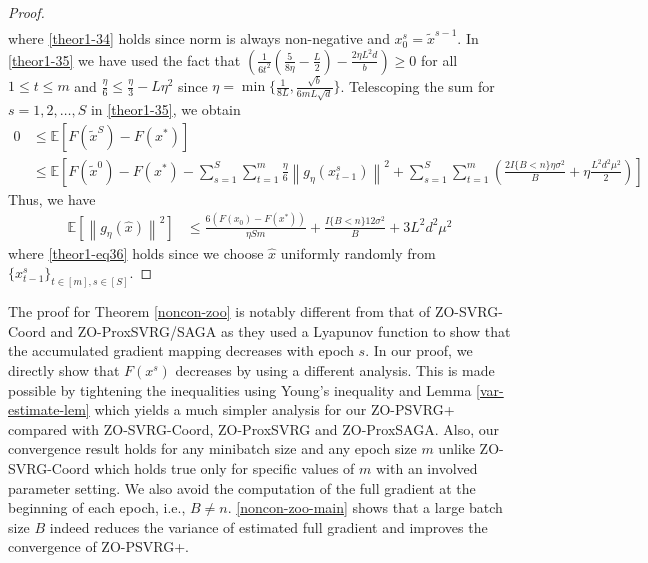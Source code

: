 \documentclass{article}
\newcommand*{\E}{\mathbb{E}}
\newcommand{\norm}[1]{\left\lVert#1\right\rVert}
\theoremstyle{definition}
\theoremstyle{remark}
\begin{document}
\begin{proof}
\begin{align}
 \end{align}
 where \eqref{theor1-34} holds since norm is always non-negative and $x_0^s = \tilde{x}^{s-1}$. In \eqref{theor1-35} we have used the fact that $(\frac{1}{6t^2}(\frac{5}{8\eta} - \frac{L}{2})-\frac{2\eta L^2 d}{b})\geq 0$ for all $1\leq t \leq m$ and $\frac{\eta}{6} \leq \frac{\eta}{3}-L\eta^2$ since $\eta = \min\{\frac{1}{8L}, \frac{\sqrt{b}}{6mL\sqrt{d}}\}$. 
 Telescoping the sum for $s = 1, 2, \ldots, S$ in \eqref{theor1-35}, we obtain
 \begin{equation*}
\begin{split} 
0 &\leq \E[F(\tilde{x}^S) - F({x}^*)] \\
&\leq \E\left[F(\tilde{x}^{0}) - F({x}^*) - \sum_{s=1}^S\sum_{t=1}^m\frac{\eta}{6}\norm{g_{\eta}(x_{t-1}^s)}^2 + \sum_{s=1}^S\sum_{t=1}^m(\frac{2I\{B < n\}\eta \sigma ^2}{B}+\eta \frac{L^2 d^2 \mu^2}{2})\right]
 \end{split}
 \end{equation*}
 Thus, we have
  \begin{align}
\E[\norm{g_{\eta}(\hat{x})}^2] & \leq \frac{6\left(F(x_0) - F({x}^*)\right)}{\eta Sm} + \frac{I\{B < n\}12\sigma ^2}{B}+3{L^2 d^2 \mu^2}\label{theor1-eq36}
 \end{align}
 where \eqref{theor1-eq36} holds since we choose  $\hat{x}$ uniformly randomly from $\{x_{t-1}^s\}_{t\in [m], s\in [S]}$. 
\end{proof} 
{\color{Violet}
The proof for Theorem \ref{noncon-zoo} is notably different from that of ZO-SVRG-Coord and ZO-ProxSVRG/SAGA as they used a Lyapunov function to show that the accumulated gradient mapping decreases with epoch $s$. In our proof, we directly show that $F(x^s)$ decreases by  using a different analysis. This is made possible by tightening the inequalities using Young's inequality and Lemma \ref{var-estimate-lem} which yields a much simpler analysis for our ZO-PSVRG+ compared with ZO-SVRG-Coord, ZO-ProxSVRG and ZO-ProxSAGA.  Also, our convergence result holds for any minibatch size and any epoch size $m$ unlike ZO-SVRG-Coord which holds true only for specific values of $m$ with an involved parameter setting.
We also avoid the computation of the full gradient at the beginning of each epoch, i.e., $B \neq n$.
} \eqref{noncon-zoo-main} shows that a large batch size $B$ indeed reduces the variance of estimated full gradient and improves the convergence of ZO-PSVRG+.
 
\end{document}
